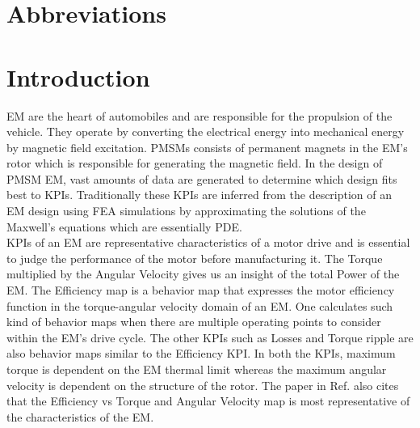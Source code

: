 \documentclass{report} %
\begin{document}
\begin{spacing}{1.2}
    \tableofcontents
\end{spacing}

\chapter*{Abbreviations}
\begin{acronym}[TDMA]
  

\end{acronym}

\newpage

\newpage

\chapter{Introduction} 

\ac{EM} are the heart of automobiles and are responsible for the propulsion of the vehicle. They operate by converting the electrical energy into mechanical energy by 
magnetic field excitation. \ac{PMSM}s consists of permanent magnets in the \ac{EM}'s rotor which is responsible for generating the magnetic field.
In the design of \ac{PMSM} \ac{EM}, vast amounts of data are generated to determine which design fits best to \ac{KPI}s.
Traditionally these \ac{KPI}s are inferred from the description of an \ac{EM} design using \ac{FEA} simulations by approximating the solutions of the Maxwell's equations 
which are essentially \ac{PDE}.\\

\ac{KPI}s of an \ac{EM} are representative characteristics of a motor drive and is essential to judge the performance of the motor before manufacturing it.
The Torque multiplied by the Angular Velocity gives us an insight of the total Power of the \ac{EM}.
The Efficiency map is a behavior map that expresses the motor efficiency function in the torque-angular velocity domain of an \ac{EM}.
One calculates such kind of behavior maps when there are multiple operating points to consider within the \ac{EM}'s drive cycle.
The other \ac{KPI}s such as Losses and Torque ripple are also behavior maps similar to the Efficiency \ac{KPI}.
In both the \ac{KPI}s, maximum torque is dependent on the \ac{EM} thermal limit whereas the maximum angular velocity is dependent on the structure of the rotor.
The paper in Ref. \cite{ETA-2021} also cites that the Efficiency vs Torque and Angular Velocity map is most representative of the characteristics of the \ac{EM}.  \\
\end{document}
